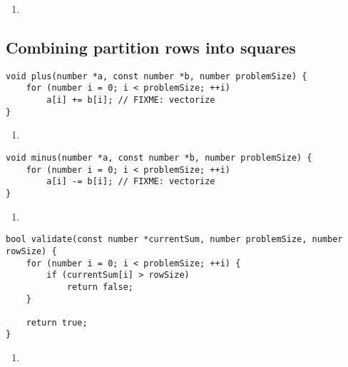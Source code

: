 \begin{enumerate}
\addtocounter{enumi}{1}
\item 
\end{enumerate}

\subsection{Combining partition rows into squares}

\begin{lstlisting}[caption={},label={plus}]
void plus(number *a, const number *b, number problemSize) {
    for (number i = 0; i < problemSize; ++i)
        a[i] += b[i]; // FIXME: vectorize
}
\end{lstlisting}

\begin{enumerate}
\addtocounter{enumi}{1}
\item 
\end{enumerate}

\begin{lstlisting}[caption={},label={minus}]
void minus(number *a, const number *b, number problemSize) {
    for (number i = 0; i < problemSize; ++i)
        a[i] -= b[i]; // FIXME: vectorize
}
\end{lstlisting}

\begin{enumerate}
\addtocounter{enumi}{1}
\item 
\end{enumerate}

\begin{lstlisting}[caption={},label={validate}]
bool validate(const number *currentSum, number problemSize, number rowSize) {
    for (number i = 0; i < problemSize; ++i) {
        if (currentSum[i] > rowSize)
            return false;
    }

    return true;
}
\end{lstlisting}

\begin{enumerate}
\addtocounter{enumi}{1}
\item 
\end{enumerate}

